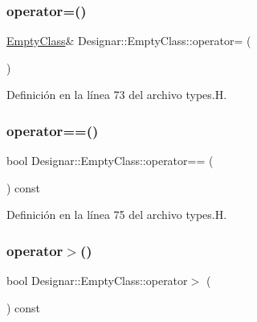 \subsubsection{\texorpdfstring{operator=()}{operator=()}\hspace{0.1cm}{\footnotesize\ttfamily [2/2]}}
{\footnotesize\ttfamily \hyperlink{class_designar_1_1_empty_class}{Empty\+Class}\& Designar\+::\+Empty\+Class\+::operator= (\begin{DoxyParamCaption}\item[{\hyperlink{class_designar_1_1_empty_class}{Empty\+Class} \&\&}]{ }\end{DoxyParamCaption})\hspace{0.3cm}{\ttfamily [inline]}}



Definición en la línea 73 del archivo types.\+H.

\mbox{\label{class_designar_1_1_empty_class_a377d66a49a2eaa853dcf5d798f82499e}} 
\subsubsection{\texorpdfstring{operator==()}{operator==()}}
{\footnotesize\ttfamily bool Designar\+::\+Empty\+Class\+::operator== (\begin{DoxyParamCaption}\item[{const \hyperlink{class_designar_1_1_empty_class}{Empty\+Class} \&}]{ }\end{DoxyParamCaption}) const\hspace{0.3cm}{\ttfamily [inline]}}



Definición en la línea 75 del archivo types.\+H.

\mbox{\label{class_designar_1_1_empty_class_a2c58de7cc499842e2de8497c4892359b}} 
\subsubsection{\texorpdfstring{operator$>$()}{operator>()}}
{\footnotesize\ttfamily bool Designar\+::\+Empty\+Class\+::operator$>$ (\begin{DoxyParamCaption}\item[{const \hyperlink{class_designar_1_1_empty_class}{Empty\+Class} \&}]{ }\end{DoxyParamCaption}) const\hspace{0.3cm}{\ttfamily [inline]}}



